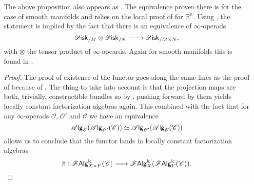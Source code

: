 \documentclass[../text.tex]{subfiles}
\begin{document}
\begin{remark}
    The above proposition also appears as \cite[prop.18]{ginot2015}. The equivalence proven there is for the case of smooth manifolds and relies on the local proof of \cite{lurie_ha} for $\mathbb{R}^n$. Using , the statement is implied by the fact that there is an equivalence of $\infty$-operads
    \begin{equation}
        \disk_{/M} \otimes \disk_{/N} \xrightarrow{\ \ \ \ \ } \disk_{/M \times N},
    \end{equation}
    with $\otimes$ the tensor product of $\infty$-opeards. Again for smooth manifolds this is found in \cite[ex.5.4.5.5]{lurie_ha}.
\end{remark}

\begin{proof}
    The proof of existence of the functor goes along the same lines as the proof of  because of . The thing to take into account is that the projection maps are both, trivially, constructible bundles so by , pushing forward by them yields locally constant factorization algebras again. This combined with the fact that for any $\infty$-operads $\mathscr{O}$, $\mathscr{O}'$ and $\mathscr{C}$ we have an equivalence
    \begin{equation}
        \mathscr{A} \mathsf{lg}_{\mathscr{O}} (\mathscr{A} \mathsf{lg}_{\mathscr{O}'} (\mathscr{C})) \simeq \mathscr{A} \mathsf{lg}_{\mathscr{O}'} (\mathscr{A} \mathsf{lg}_{\mathscr{O}} (\mathscr{C}))
    \end{equation}
    allows us to conclude that the functor lands in locally constant factorization algebras
    \begin{equation}
        \bar{\pi}: \mathscr{F} \mathsf{Alg}^{\mathsf{lc}}_{X \times Y}(\mathscr{C}) \xrightarrow{\ \ \ \ } \mathscr{F} \mathsf{Alg}^{\mathsf{lc}}_{X}(\mathscr{F} \mathsf{Alg}^{\mathsf{lc}}_{Y}(\mathscr{C})).
    \end{equation}


\end{proof}
\end{document}
